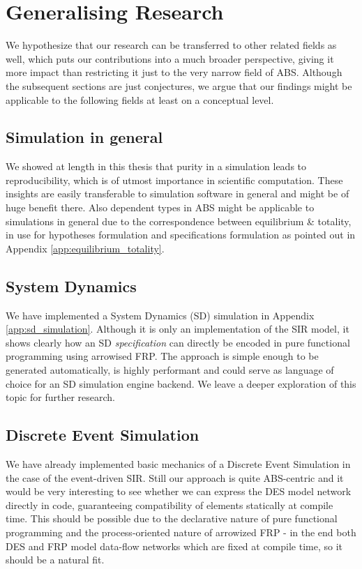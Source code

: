 \section{Generalising Research}
We hypothesize that our research can be transferred to other related fields as well, which puts our contributions into a much broader perspective, giving it more impact than restricting it just to the very narrow field of ABS. Although the subsequent sections are just conjectures, we argue that our findings might be applicable to the following fields at least on a conceptual level.

\subsection{Simulation in general}
We showed at length in this thesis that purity in a simulation leads to reproducibility, which is of utmost importance in scientific computation. These insights are easily transferable to simulation software in general and might be of huge benefit there. Also dependent types in ABS might be applicable to simulations in general due to the correspondence between equilibrium \& totality, in use for hypotheses formulation and specifications formulation as pointed out in Appendix \ref{app:equilibrium_totality}. 

\subsection{System Dynamics}
We have implemented a System Dynamics (SD) simulation in Appendix \ref{app:sd_simulation}. Although it is only an implementation of the SIR model, it shows clearly how an SD \textit{specification} can directly be encoded in pure functional programming using arrowised FRP. The approach is simple enough to be generated automatically, is highly performant and could serve as language of choice for an SD simulation engine backend. We leave a deeper exploration of this topic for further research.

\subsection{Discrete Event Simulation}
We have already implemented basic mechanics of a Discrete Event Simulation in the case of the event-driven SIR. Still our approach is quite ABS-centric and it would be very interesting to see whether we can express the DES model network directly in code, guaranteeing compatibility of elements statically at compile time. This should be possible due to the declarative nature of pure functional programming and the process-oriented nature of arrowized FRP - in the end both DES and FRP model data-flow networks which are fixed at compile time, so it should be a natural fit.

